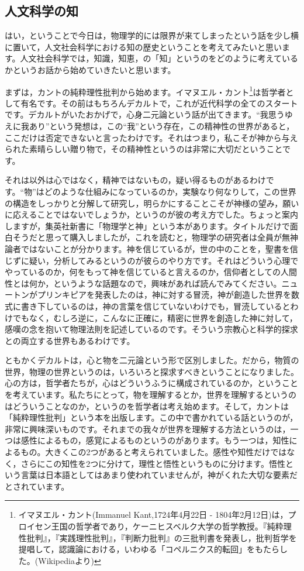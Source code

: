 \documentclass{ltjsbook}
\begin{document}
\subsection{人文科学の知}
はい，ということで今日は，物理学的には限界が来てしまったという話を少し横に置いて，人文社会科学における知の歴史ということを考えてみたいと思います。人文社会科学では，知識，知恵，の「知」というのをどのように考えているかというお話から始めていきたいと思います。

まずは，カントの純粋理性批判から始めます。イマヌエル・カント\footnote{イマヌエル・カント(Immanuel Kant,1724年4月22日 - 1804年2月12日)は，プロイセン王国の哲学者であり，ケーニヒスベルク大学の哲学教授。『純粋理性批判』，『実践理性批判』，『判断力批判』の三批判書を発表し，批判哲学を提唱して，認識論における，いわゆる「コペルニクス的転回」をもたらした。(Wikipediaより)}は哲学者として有名です。その前はもちろんデカルトで，これが近代科学の全てのスタートです。デカルトがいたおかげで，心身二元論という話が出てきます。``我思うゆえに我あり''という発想は，この``我''という存在，この精神性の世界があると，ここだけは否定できないと言ったわけです。それはつまり，私こそが神から与えられた素晴らしい贈り物で，その精神性というのは非常に大切だということです。

それは以外は心ではなく，精神ではないもの，疑い得るものがあるわけです。``物''はどのような仕組みになっているのか，実験なり何なりして，この世界の構造をしっかりと分解して研究し，明らかにすることこそが神様の望み，願いに応えることではないでしょうか，というのが彼の考え方でした。ちょっと案内しますが，集英社新書に「物理学と神」\parencite{ikeuchi2002}という本があります。タイトルだけで面白そうだと思って購入しましたが，これを読むと，物理学の研究者は全員が無神論者ではないことが分かります。神を信じているが，世の中のことを，聖書を信じずに疑い，分析してみるというのが彼らのやり方です。それはどういう心理でやっているのか，何をもって神を信じていると言えるのか，信仰者としての人間性とは何か，というような話題なので，興味があれば読んでみてください。ニュートンがプリンキピアを発表したのは，神に対する冒涜，神が創造した世界を数式に書き下しているのは，神の言葉を信じていないわけでも，冒涜しているとわけでもなく，むしろ逆に，こんなに正確に，精密に世界を創造した神に対して，感嘆の念を抱いて物理法則を記述しているのです。そういう宗教心と科学的探求との両立する世界もあるわけです。

ともかくデカルトは，心と物を二元論という形で区別しました。だから，物質の世界，物理の世界というのは，いろいろと探求すべきということになりました。心の方は，哲学者たちが，心はどういうふうに構成されているのか，ということを考えています。私たちにとって，物を理解するとか，世界を理解するというのはどういうことなのか，というのを哲学者は考え始めます。そして，カントは「純粋理性批判」\parencite{Kant1961}という本を出版します。この中で書かれている話というのが，非常に興味深いものです。それまでの我々が世界を理解する方法というのは，一つは感性によるもの，感覚によるものというのがあります。もう一つは，知性によるもの。大きくこの2つがあると考えられていました。感性や知性だけではなく，さらにこの知性を2つに分けて，理性と悟性というものに分けます。悟性という言葉は日本語としてはあまり使われていませんが，神がくれた大切な要素だとされています。
\end{document}
